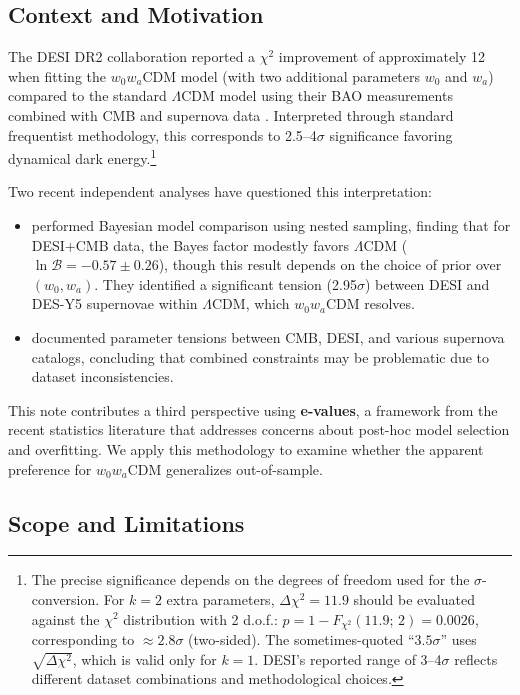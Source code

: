 \documentclass[11pt,a4paper]{article}
\newcommand{\LCDM}{$\Lambda$CDM}
\begin{document}
\subsection{Context and Motivation}

The DESI DR2 collaboration reported a $\chi^2$ improvement of approximately 12 when fitting the $w_0w_a$CDM model (with two additional parameters $w_0$ and $w_a$) compared to the standard \LCDM{} model using their BAO measurements combined with CMB and supernova data \citep{DESI2025}. Interpreted through standard frequentist methodology, this corresponds to 2.5--4$\sigma$ significance favoring dynamical dark energy.\footnote{The precise significance depends on the degrees of freedom used for the $\sigma$-conversion. For $k=2$ extra parameters, $\Delta\chi^2 = 11.9$ should be evaluated against the $\chi^2$ distribution with 2 d.o.f.: $p = 1 - F_{\chi^2}(11.9;\, 2) = 0.0026$, corresponding to $\approx 2.8\sigma$ (two-sided). The sometimes-quoted ``$3.5\sigma$'' uses $\sqrt{\Delta\chi^2}$, which is valid only for $k=1$. DESI's reported range of 3--4$\sigma$ reflects different dataset combinations and methodological choices.}

Two recent independent analyses have questioned this interpretation:
\begin{itemize}
    \item \citet{OngBayesian2025} performed Bayesian model comparison using nested sampling, finding that for DESI+CMB data, the Bayes factor modestly favors \LCDM{} ($\ln \mathcal{B} = -0.57 \pm 0.26$), though this result depends on the choice of prior over $(w_0, w_a)$. They identified a significant tension (2.95$\sigma$) between DESI and DES-Y5 supernovae within \LCDM{}, which $w_0w_a$CDM resolves.

    \item \citet{WangMota2025} documented parameter tensions between CMB, DESI, and various supernova catalogs, concluding that combined constraints may be problematic due to dataset inconsistencies.
\end{itemize}

This note contributes a third perspective using \textbf{e-values}, a framework from the recent statistics literature \citep{Vovk2021,Shafer2021,Ramdas2023} that addresses concerns about post-hoc model selection and overfitting. We apply this methodology to examine whether the apparent preference for $w_0w_a$CDM generalizes out-of-sample.

\subsection{Scope and Limitations}
\end{document}
